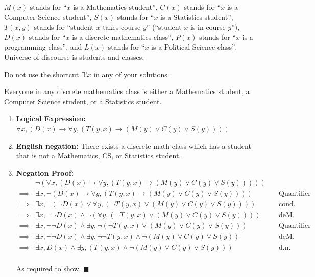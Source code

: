 \documentclass[]{article}
\begin{document}
$M(x)$ stands for “$x$ is a Mathematics student”, $C(x)$ stands for “$x$ is a Computer Science student”, $S(x)$ stands
for “$x$ is a Statistics student”, $T(x, y)$ stands for “student $x$ takes course $y$” (“student $x$ is in course $y$”), $D(x)$ stands
for “$x$ is a discrete mathematics class”, $P(x)$ stands for “$x$ is a programming class”, and $L(x)$ stands for “$x$ is a
Political Science class”. Universe of discourse is students and classes. 

Do not use the shortcut $\exists!x$ in any of your solutions.
\begin{question}{2.1}
Everyone in any discrete mathematics class is either a Mathematics student, a Computer Science student, or a Statistics student.
\end{question}
\begin{enumerate}[label=(\alph*)]
    \item \textbf{Logical Expression:} $\forall x, (D(x) \rightarrow \forall y, (T(y, x) \rightarrow (M(y) \lor C(y) \lor S(y))))$
    \item \textbf{English negation:} There exists a discrete math class which has a student that is not a Mathematics, CS, or Statistics student.
    \item \textbf{Negation Proof:}
    \begin{align*}
        &\neg(\forall x, (D(x) \rightarrow \forall y, (T(y, x) \rightarrow (M(y) \lor C(y) \lor S(y))))) \quad & \\
        \implies&\exists x, \neg(D(x) \rightarrow \forall y, (T(y, x) \rightarrow (M(y) \lor C(y) \lor S(y)))) \quad & \text{Quantifier Negation} \\
        \implies&\exists x, \neg(\neg D(x) \lor \forall y, (\neg T(y, x) \lor (M(y) \lor C(y) \lor S(y)))) \quad & \text{cond.} \\
        \implies&\exists x, \neg\neg D(x) \land  \neg(\forall y, (\neg T(y, x) \lor (M(y) \lor C(y) \lor S(y)))) \quad & \text{deM.} \\
        \implies&\exists x, \neg\neg D(x) \land  \exists y, \neg(\neg T(y, x) \lor (M(y) \lor C(y) \lor S(y))) \quad & \text{Quantifier Negation} \\
        \implies&\exists x, \neg\neg D(x) \land  \exists y, \neg\neg T(y, x) \land \neg(M(y) \lor C(y) \lor S(y)) \quad & \text{deM.} \\
        \implies&\exists x, D(x) \land  \exists y, (T(y, x) \land \neg(M(y) \lor C(y) \lor S(y))) \quad & \text{d.n.} \\
    \end{align*}
    \begin{center}
        As required to show. $\blacksquare$
    \end{center}
\end{enumerate}
\end{document}
